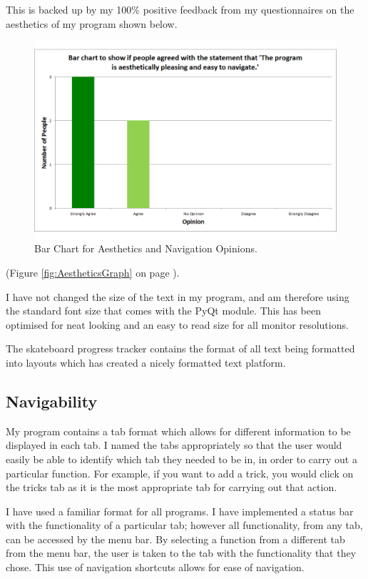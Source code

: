 This is backed up by my 100\% positive feedback from my questionnaires on the aesthetics of my program shown below.

\begin{figure}[H]
    \includegraphics[width=\textwidth]{./Evaluation/images/AestheticsGraph.pdf}
    \caption{Bar Chart for Aesthetics and Navigation Opinions.} \label{fig:AestheticsGraphCopy}
\end{figure}

(Figure \ref{fig:AestheticsGraph} on page \pageref{fig:AestheticsGraph}).

I have not changed the size of the text in my program, and am therefore using the standard font size that comes with the PyQt module. This has been optimised for neat looking and an easy to read size for all monitor resolutions. 

The skateboard progress tracker contains the format of all text being formatted into layouts which has created a nicely formatted text platform. 

	\subsection{Navigability}

My program contains a tab format which allows for different information to be displayed in each tab. I named the tabs appropriately so that the user would easily be able to identify which tab they needed to be in, in order to carry out a particular function. For example, if you want to add a trick, you would click on the tricks tab as it is the most appropriate tab for carrying out that action.

I have used a familiar format for all programs. I have implemented a status bar with the functionality of a particular tab; however all functionality, from any tab, can be accessed by the menu bar. By selecting a function from a different tab from the menu bar, the user is taken to the tab with the functionality that they chose. This use of navigation shortcuts allows for ease of navigation.

